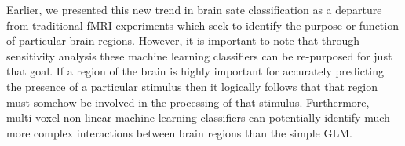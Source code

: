 \documentclass[final]{article}
\begin{document}
Earlier, we presented this new trend in brain sate classification as a departure from traditional fMRI experiments which seek to identify the purpose or function of particular brain regions.
However, it is important to note that through sensitivity analysis these machine learning classifiers can be re-purposed for just that goal.
If a region of the brain is highly important for accurately predicting the presence of a particular stimulus then it logically follows that that region must somehow be involved in the processing of that stimulus.
Furthermore, multi-voxel non-linear machine learning classifiers can potentially identify much more complex interactions between brain regions than the simple GLM.



\end{document}
